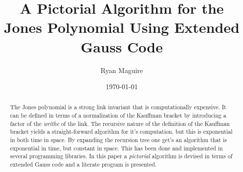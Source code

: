 \documentclass{article}
\title{A Pictorial Algorithm for the Jones Polynomial Using Extended Gauss Code}
\author{Ryan Maguire}
\date{\today}
\theoremstyle{plain}
\begin{document}
    \maketitle
    \tableofcontents
    \begin{abstract}
        \noindent
        The Jones polynomial is a strong link invariant that is computationally
        expensive. It can be defined in terms of a normalization of the Kauffman
        bracket by introducing a factor of the \textit{writhe} of the link.
        The recursive nature of the definition of the Kauffman bracket yields a
        straight-forward algorithm for it's computation, but this is
        exponential in both time in space. By expanding the recursion tree one
        get's an algorithm that is exponential in time, but constant in space.
        This has been done and implemented in several programming libraries.
        In this paper a \textit{pictorial} algorithm is devised in terms of
        extended Gauss code and a literate program is presented.
    \end{abstract}
\end{document}
